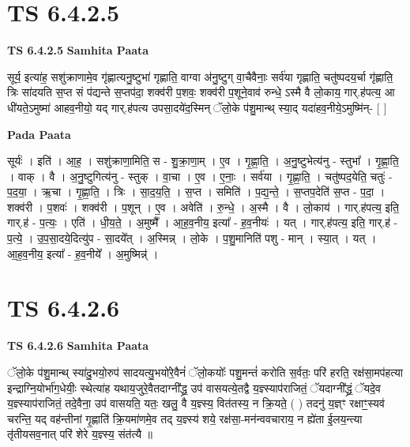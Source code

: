 \documentclass[17pt]{extarticle}
\begin{document}
\section*{ TS 6.4.2.5 }

\textbf{TS 6.4.2.5 } \newline
\textbf{Samhita Paata} \newline

सूर्य॒ इत्या॑ह॒ सशु॑क्राणामे॒व गृ॑ह्णात्यनु॒ष्टुभा॑ गृह्णाति॒ वाग्वा अ॑नु॒ष्टुग् वा॒चैवैनाः॒ सर्व॑या गृह्णाति॒ चतु॑ष्पदय॒र्चा गृ॑ह्णाति॒ त्रिः सा॑दयति स॒प्त सं प॑द्यन्ते स॒प्तप॑दा॒ शक्व॑री प॒शवः॒ शक्व॑री प॒शूने॒वाव॑ रुन्धे॒ ऽस्मै वै लो॒काय॒ गार्.ह॑पत्य॒ आ धी॑यते॒ऽमुष्मा॑ आहव॒नीयो॒ यद् गार्.ह॑पत्य उपसा॒दये॑द॒स्मिन् ॅलो॒के प॑शु॒मान्थ् स्या॒द् यदा॑हव॒नीये॒ऽमुष्मि॑न्- [  ] \newline

\textbf{Pada Paata} \newline

सूर्यः॑ । इति॑ । आ॒ह॒ । सशु॑क्राणा॒मिति॒ स - शु॒क्रा॒णा॒म् । ए॒व । गृ॒ह्णा॒ति॒ । अ॒नु॒ष्टुभेत्य॑नु - स्तुभा᳚ । गृ॒ह्णा॒ति॒ । वाक् । वै । अ॒नु॒ष्टुगित्य॑नु - स्तुक् । वा॒चा । ए॒व । ए॒नाः॒ । सर्व॑या । गृ॒ह्णा॒ति॒ । चतु॑ष्पद॒येति॒ चतुः॑ - प॒द॒या॒ । ऋ॒चा । गृ॒ह्णा॒ति॒ । त्रिः । सा॒द॒य॒ति॒ । स॒प्त । समिति॑ । प॒द्य॒न्ते॒ । स॒प्तप॒देति॑ स॒प्त - प॒दा॒ । शक्व॑री । प॒शवः॑ । शक्व॑री । प॒शून् । ए॒व । अवेति॑ । रु॒न्धे॒ । अ॒स्मै । वै । लो॒काय॑ । गार्.ह॑पत्य॒ इति॒ गार्.ह॑ - प॒त्यः॒ । एति॑ । धी॒य॒ते॒ । अ॒मुष्मै᳚ । आ॒ह॒व॒नीय॒ इत्या᳚ - ह॒व॒नीयः॑ । यत् । गार्.ह॑पत्य॒ इति॒ गार्.ह॑ - प॒त्ये॒ । उ॒प॒सा॒दये॒दित्यु॑प - सा॒दये᳚त् । अ॒स्मिन्न् । लो॒के । प॒शु॒मानिति॑ पशु - मान् । स्या॒त् । यत् । आ॒ह॒व॒नीय॒ इत्या᳚ - ह॒व॒नीये᳚ । अ॒मुष्मिन्न्॑ ।  \newline




\section*{ TS 6.4.2.6 }

\textbf{TS 6.4.2.6 } \newline
\textbf{Samhita Paata} \newline

ॅलो॒के प॑शु॒मान्थ् स्या॑दु॒भयो॒रुप॑ सादयत्यु॒भयो॑रे॒वैनं॑ ॅलो॒कयोः᳚ पशु॒मन्तं॑ करोति स॒र्वतः॒ परि॑ हरति॒ रक्ष॑सा॒मप॑हत्या इन्द्राग्नि॒योर्भा॑ग॒धेयीः॒ स्थेत्या॑ह यथाय॒जुरे॒वैतदाग्नी᳚द्ध्र॒ उप॑ वासयत्ये॒तद्वै य॒ज्ञ्स्याप॑राजितं॒ ॅयदाग्नी᳚द्ध्रं॒ ॅयदे॒व य॒ज्ञ्स्याप॑राजितं॒ तदे॒वैना॒ उप॑ वासयति॒ यतः॒ खलु॒ वै य॒ज्ञ्स्य॒ वित॑तस्य॒ न क्रि॒यते॒ ( ) तदनु॑ य॒ज्ञ्ꣳ रक्षाꣳ॒॒स्यव॑ चरन्ति॒ यद् वह॑न्तीनां गृ॒ह्णाति॑ क्रि॒यमा॑णमे॒व तद् य॒ज्ञ्स्य॑ शये॒ रक्ष॑सा॒-मन॑न्ववचाराय॒ न ह्ये॑ता ई॒लय॒न्त्या तृ॑तीयसव॒नात् परि॑ शेरे य॒ज्ञ्स्य॒ संत॑त्यै ॥ \newline
\end{document}
